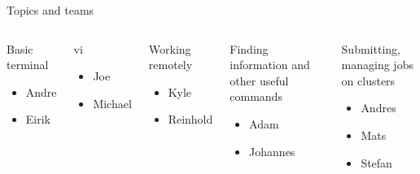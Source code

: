 \begin{frame}{Topics and teams}
\footnotesize

\begin{columns}
   \begin{block}{Basic terminal}
    \begin{itemize}
      \item Andre
      \item Eirik
    \end{itemize}
   \end{block}

   \begin{block}{vi}
    \begin{itemize}
      \item Joe
      \item Michael
    \end{itemize}
   \end{block}

   \begin{block}{Working remotely}
    \begin{itemize}
      \item Kyle
      \item Reinhold
    \end{itemize}
   \end{block}

   \begin{block}{Finding information and other useful commands}
    \begin{itemize}
      \item Adam
      \item Johannes
    \end{itemize}
   \end{block}

   \begin{block}{Submitting, managing jobs on clusters}
    \begin{itemize}
      \item Andres
      \item Mats
      \item Stefan
    \end{itemize}
   \end{block}
\end{columns}

%
%
%
%
%
%
%
%
%
%
%
%
%

\end{frame}
